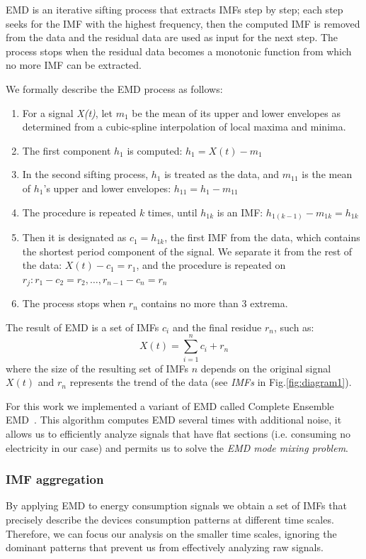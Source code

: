 EMD is an iterative sifting process that extracts IMFs step by step; each step seeks for the IMF with the highest frequency, then the 
computed IMF is removed from the data and the residual data are used as input for the next step.
The process stops when the residual data becomes a monotonic function from which no more IMF can be extracted.

We formally describe the EMD process as follows: 
\begin{enumerate}
\item For a signal \emph{X(t)}, let $m_1$ be the mean of its upper and lower envelopes as determined from a cubic-spline interpolation of local maxima and minima.
\item The first component $h_1$ is computed: $h_1=X(t)-m_1$
\item In the second sifting process, $h_1$ is treated as the data, and $m_{11}$ is the mean of $h_1$'s upper and lower envelopes: $h_{11}=h_1-m_{11}$
\item The procedure is repeated $k$ times, until $h_{1k}$ is an IMF: $h_{1(k-1)}-m_{1k}=h_{1k}$
\item Then it is designated as $c_1=h_{1k}$, the first IMF from the data, which contains the shortest period component of the signal. We separate it from the rest of the data: $X(t)-c_1 = r_1$, and the procedure is
repeated on $r_j: r_1-c_2 = r_2,\dots,r_{n-1} - c_n = r_n$
\item The process stops when $r_n$ contains no more than 3 extrema.
\end{enumerate}

The result of EMD is a set of IMFs $c_i$ and the final residue $r_n$, such as: \[X(t)=\sum^{n}_{i=1}c_i+r_n\]
where the size of the resulting set of IMFs $n$ depends on the original signal $X(t)$ and $r_n$ represents the trend of 
the data (see \emph{IMFs} in Fig.\ref{fig:diagram1}).

For this work we implemented a variant of EMD called Complete Ensemble EMD~\cite{torres:icassp2012}.
This algorithm computes EMD several times with additional noise, it allows us to efficiently analyze signals that have 
flat sections (i.e. consuming no electricity in our case) and permits us to solve the \emph{EMD mode mixing problem}.

\subsubsection{IMF aggregation} \label{methodo:corr}
By applying EMD to energy consumption signals we obtain a set of IMFs that precisely describe the devices consumption 
patterns at different time scales.  Therefore, we can focus our analysis on the smaller time scales, ignoring the dominant 
patterns that prevent us from effectively analyzing raw signals.

